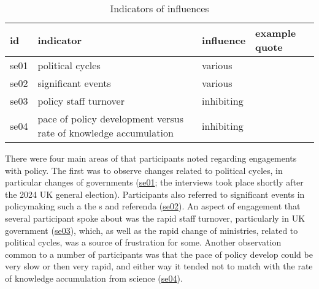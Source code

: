\begin{table}[!ht]
\footnotesize
\caption{Indicators of \skieven{} influences}\label{tab:resskieven}
\begin{tabular}{L{.07\linewidth}L{.3\linewidth}L{.11\linewidth}L{.52\linewidth}} \hline
\textbf{id} & \textbf{indicator} & \textbf{influence} & \textbf{example quote} \\ \hline \hline 
se01 & political cycles & various &  \\[5mm]
se02 & significant events & various &  \\[5mm]
se03 & policy staff turnover & inhibiting &  \\[5mm]
se04 & pace of policy development versus rate of knowledge accumulation & inhibiting &  \\[5mm]
\hline
\end{tabular}
\end{table}


There were four main areas of \skieven{} that participants noted regarding engagements with policy. The first was to observe changes related to political cycles, in particular changes of governments (\hyperref[tab:resskieven]{se01}; the interviews took place shortly after the 2024 UK general election). Participants also referred to significant events in policymaking such a the \COP s and referenda (\hyperref[tab:resskieven]{se02}). An aspect of engagement that several participant spoke about was the rapid staff turnover, particularly in UK government (\hyperref[tab:resskieven]{se03}), which, as well as the rapid change of ministries, related to political cycles, was a source of frustration for some. Another observation common to a number of participants was that the pace of policy develop could be very slow or then very rapid, and either way it tended not to match with the rate of knowledge accumulation from science (\hyperref[tab:resskieven]{se04}). 

